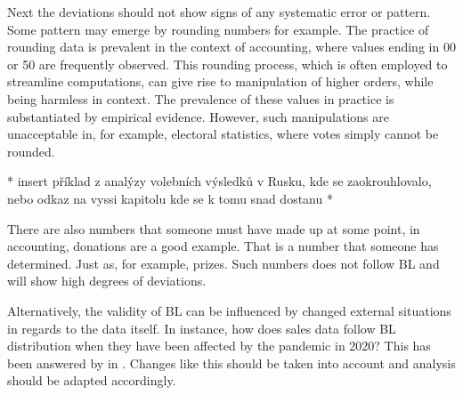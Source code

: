 
Next the deviations should not show signs of any systematic error or pattern. Some pattern may emerge by rounding numbers for example. The practice of rounding data is prevalent in the context of accounting, where values ending in 00 or 50 are frequently observed. This rounding process, which is often employed to streamline computations, can give rise to manipulation of higher orders, while being harmless in context. The prevalence of these values in practice is substantiated by empirical evidence. %
However, such manipulations are unacceptable in, for example, electoral statistics, where votes simply cannot be rounded.
\cite{kossovsky2014benford}

\begin{koment}
    * insert příklad z analýzy volebních výsledků v Rusku, kde se zaokrouhlovalo, nebo odkaz na vyssi kapitolu kde se k tomu snad dostanu * 
\end{koment}

There are also numbers that someone must have made up at some point, in accounting, donations are a good example. That is a number that someone has determined. Just as, for example, prizes. Such numbers does not follow BL and will show high degrees of deviations. \cite{kossovsky2014benford}

Alternatively, the validity of BL can be influenced by changed external situations in regards to the data itself. In instance, how does sales data follow BL distribution when they have been affected by the pandemic in 2020? This has been answered by \citeauthor{Hronova2023} in \citeyear{Hronova2023}. Changes like this should be taken into account and analysis should be adapted accordingly.


